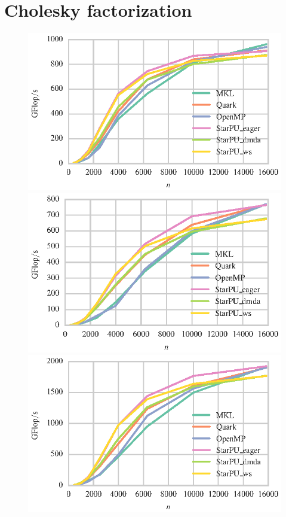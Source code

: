 \documentclass[a4paper,12pt]{article}
\begin{document}
\section{Cholesky factorization}
\label{sec.cholesky}
\begin{figure}[t]
  \centering
  \includegraphics[scale=.85]{fig/kebnekaise_zpotrf_weak_scaling.eps}
  \includegraphics[scale=.85]{fig/kebnekaise_dpotrf_weak_scaling.eps}
  \includegraphics[scale=.85]{fig/kebnekaise_cpotrf_weak_scaling.eps}

\end{figure}
\end{document}
